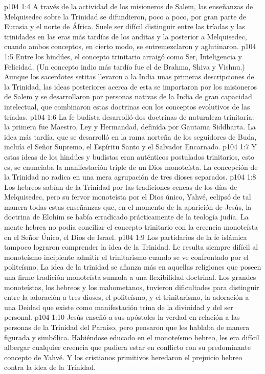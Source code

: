 \vs p104 1:4 A través de la actividad de los misioneros de Salem, las enseñanzas de Melquisedec sobre la Trinidad se difundieron, poco a poco, por gran parte de Eurasia y el norte de África. Suele ser difícil distinguir entre las tríadas y las trinidades en las eras más tardías de los anditas y la posterior a Melquisedec, cuando ambos conceptos, en cierto modo, se entremezclaron y aglutinaron.
\vs p104 1:5 \pc Entre los hindúes, el concepto trinitario arraigó como Ser, Inteligencia y Felicidad. (Un concepto indio más tardío fue el de Brahma, Shiva y Vishnu.) Aunque los sacerdotes setitas llevaron a la India unas primeras descripciones de la Trinidad, las ideas posteriores acerca de esta se importaron por los misioneros de Salem y se desarrollaron por personas nativas de la India de gran capacidad intelectual, que combinaron estas doctrinas con los conceptos evolutivos de las tríadas.
\vs p104 1:6 La fe budista desarrolló dos doctrinas de naturaleza trinitaria: la primera fue Maestro, Ley y Hermandad, definida por Gautama Siddharta. La idea más tardía, que se desarrolló en la rama norteña de los seguidores de Buda, incluía el Señor Supremo, el Espíritu Santo y el Salvador Encarnado.
\vs p104 1:7 Y estas ideas de los hindúes y budistas eran auténticos postulados trinitarios, esto es, se enunciaba la manifestación triple de un Dios monoteísta. La concepción de la Trinidad no radica en una mera agrupación de tres dioses separados.
\vs p104 1:8 \pc Los hebreos sabían de la Trinidad por las tradiciones ceneas de los días de Melquisedec, pero su fervor monoteísta por el Dios único, Yahvé, eclipsó de tal manera todas estas enseñanzas que, en el momento de la aparición de Jesús, la doctrina de Elohim se había erradicado prácticamente de la teología judía. La mente hebrea no podía conciliar el concepto trinitario con la creencia monoteísta en el Señor Único, el Dios de Israel.
\vs p104 1:9 Los partidarios de la fe islámica tampoco lograron comprender la idea de la Trinidad. Le resulta siempre difícil al monoteísmo incipiente admitir el trinitarismo cuando se ve confrontado por el politeísmo. La idea de la trinidad se afianza más en aquellas religiones que poseen una firme tradición monoteísta sumada a una flexibilidad doctrinal. Los grandes monoteístas, los hebreos y los mahometanos, tuvieron dificultades para distinguir entre la adoración a tres dioses, el politeísmo, y el trinitarismo, la adoración a una Deidad que existe como manifestación trina de la divinidad y del ser personal.
\vs p104 1:10 \pc Jesús enseñó a sus apóstoles la verdad en relación a las personas de la Trinidad del Paraíso, pero pensaron que les hablaba de manera figurada y simbólica. Habiéndose educado en el monoteísmo hebreo, les era difícil albergar cualquier creencia que pudiera estar en conflicto con su predominante concepto de Yahvé. Y los cristianos primitivos heredaron el prejuicio hebreo contra la idea de la Trinidad.
